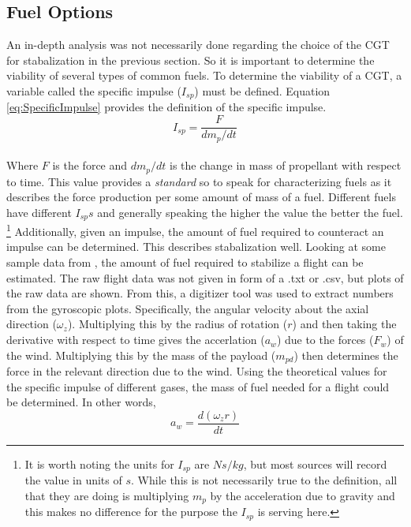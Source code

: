 \subsection{Fuel Options}
An in-depth analysis was not necessarily done regarding the choice of the CGT for stabalization in the previous section. So it is important to determine the viability of several types of common fuels. To determine the viability of a CGT, a variable called the specific impulse ($I_{sp}$) must be defined. Equation \ref{eq:SpecificImpulse} provides the definition of the specific impulse.
\begin{equation}\label{eq:SpecificImpulse}
I_{sp}=\frac{F}{dm_p/dt}
\end{equation}%
%
%
%
\\
Where $F$ is the force and $dm_p/dt$ is the change in mass of propellant with respect to time. This value provides a \textit{standard} so to speak for characterizing fuels as it describes the force production per some amount of mass of a fuel. Different fuels have different $I_{sp}s$ and generally speaking the higher the value the better the fuel. \footnote{It is worth noting the units for $I_{sp}$ are $Ns/kg$, but most sources will record the value in units of $s$. While this is not necessarily true to the definition, all that they are doing is multiplying $m_p$ by the acceleration due to gravity and this makes no difference for the purpose the $I_{sp}$ is serving here.} Additionally, given an impulse, the amount of fuel required to counteract an impulse can be determined. This describes stabalization well. Looking at some sample data from \cite{titan1hab}, the amount of fuel required to stabilize a flight can be estimated. The raw flight data was not given in form of a .txt or .csv, but plots of the raw data are shown. From this, a digitizer tool was used to extract numbers from the gyroscopic plots. Specifically, the angular velocity about the axial direction ($\omega_z$). Multiplying this by the radius of rotation ($r$) and then taking the derivative with respect to time gives the accerlation ($a_w$) due to the forces ($F_w$) of the wind. Multiplying this by the mass of the payload ($m_{pd}$) then determines the force in the relevant direction due to the wind. Using the theoretical values for the specific impulse of different gases, the mass of fuel needed for a flight could be determined. In other words,
\begin{equation}\label{eq:alpha}
a_w = \frac{d(\omega_z r)}{dt}
\end{equation}%
